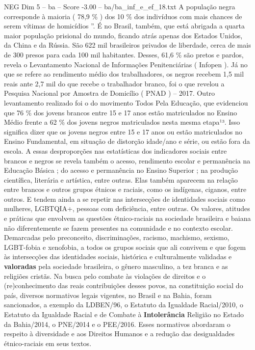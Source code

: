 \begin{textsample}{NEG Dim 5 – ba – Score -3.00 – ba/ba\_inf\_e\_ef\_18.txt}
A população negra corresponde à maioria ( 78,9 \% ) dos 10 \% dos indivíduos com mais chances de serem vítimas de homicídios ”.
É no Brasil, também, que está abrigada a quarta maior população prisional do mundo, ficando atrás apenas dos Estados Unidos, da China e da Rússia.
São 622 mil brasileiros privados de liberdade, cerca de mais de 300 presos para cada 100 mil habitantes.
Desses, 61,6 \% são pretos e pardos, revela o Levantamento Nacional de Informações Penitenciárias ( Infopen ).
Já no que se refere ao rendimento médio dos trabalhadores, os negros recebem 1,5 mil reais ante 2,7 mil do que recebe o trabalhador branco, foi o que revelou a Pesquisa Nacional por Amostra de Domicílio ( PNAD ) – 2017.
Outro levantamento realizado foi o do movimento Todos Pela Educação, que evidenciou que 76 \% dos jovens brancos entre 15 e 17 anos estão matriculados no Ensino Médio frente a 62 \% dos jovens negros matriculados nesta mesma etapa¹³.
Isso significa dizer que os jovens negros entre 15 e 17 anos ou estão matriculados no Ensino Fundamental, em situação de distorção idade/ano e série, ou estão fora da escola.
A essas desproporções nas estatísticas dos indicadores sociais entre brancos e negros se revela também o acesso, rendimento escolar e permanência na Educação Básica ; do acesso e permanência no Ensino Superior ; na produção científica, literária e artística, entre outras.
Elas também aparecem na relação entre brancos e outros grupos étnicos e raciais, como os indígenas, ciganos, entre outros.
E tendem ainda a se repetir nas intersecções de identidades sociais como mulheres, LGBTQIA+, pessoas com deficiência, entre outras.
Os valores, atitudes e práticas que envolvem as questões étnico-raciais na sociedade brasileira e baiana não diferentemente se fazem presentes na comunidade e no contexto escolar.
Demarcadas pelo preconceito, discriminações, racismo, machismo, sexismo, LGBT-fobia e xenofobia, a todos os grupos sociais que ali convivem e que fogem às intersecções das identidades sociais, histórica e culturalmente validadas e \textbf{valoradas} pela sociedade brasileira, o gênero masculino, a tez branca e as religiões cristãs.
Na busca pelo combate às violações de direitos e o (re)conhecimento das reais contribuições desses povos, na constituição social do país, diversos normativos legais vigentes, no Brasil e na Bahia, foram sancionados, a exemplo da LDBEN/96, o Estatuto da Igualdade Racial/2010, o Estatuto da Igualdade Racial e de Combate à \textbf{Intolerância} Religião no Estado da Bahia/2014, o PNE/2014 e o PEE/2016.
Esses normativos abordaram o respeito à diversidade e aos Direitos Humanos e a redução das desigualdades étnico-raciais em seus textos.

\end{textsample}
